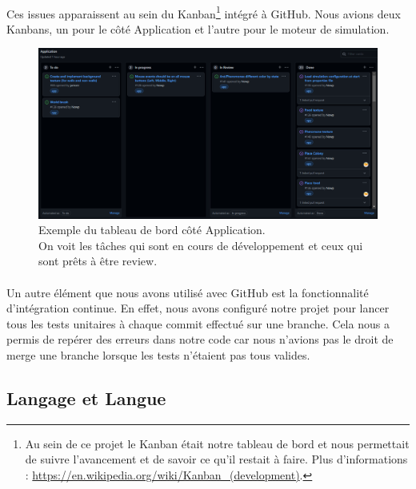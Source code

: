 \documentclass{EPUProjetDi}
\begin{document}
\paragraph{}
Ces issues apparaissent au sein du Kanban\footnote{Au sein de ce projet le Kanban était notre tableau de bord et nous permettait de suivre 
l'avancement et de savoir ce qu'il restait à faire. Plus d'informations : \url{https://en.wikipedia.org/wiki/Kanban_(development)}.}
intégré à GitHub. Nous avions deux Kanbans, un pour le côté Application et l'autre pour le moteur de simulation.

\begin{figure}[h]
\centering
\includegraphics[scale=.4]{Kanban.png}
\caption{Exemple du tableau de bord côté Application. 
\\On voit les tâches qui sont en cours de développement et ceux qui sont prêts à être review.}
\label{fig:Kanban}
\end{figure}

\paragraph{}
Un autre élément que nous avons utilisé avec GitHub est la fonctionnalité d'intégration continue. En effet, nous avons configuré notre projet 
pour lancer tous les tests unitaires à chaque commit effectué sur une branche.
Cela nous a permis de repérer des erreurs dans notre code car nous n'avions pas le droit de merge une branche lorsque les tests n'étaient pas tous valides.

\subsection{Langage et Langue}
\end{document}
